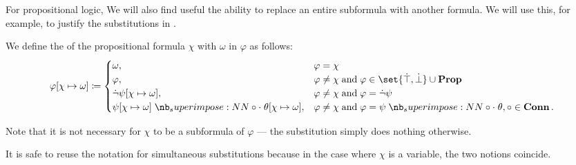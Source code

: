 For propositional logic, We will also find useful the ability to replace an entire subformula with another formula. We will use this, for example, to justify the substitutions in .

\begin{definition}\label{def:literal_propositional_substitution}
  We define the  of the propositional formula \( \chi \) with \( \omega \) in \( \varphi \) as follows:
  \begin{equation}\label{eq:def:propositional_substitution/single}
    \varphi[\chi \mapsto \omega] \coloneqq \begin{cases}
      \omega,                                                         &\varphi = \chi \\
      \varphi,                                                        &\varphi \neq \chi \T{and} \varphi \in \set{ \syntop, \synbot } \cup \op*{Prop} \\
      \synneg \psi[\chi \mapsto \omega],                              &\varphi \neq \chi \T{and} \varphi = \synneg \psi \\
      \psi[\chi \mapsto \omega] \syncirc \theta[\chi \mapsto \omega], &\varphi \neq \chi \T{and} \varphi = \psi \syncirc \theta, \circ \in \op*{Conn}.
    \end{cases}
  \end{equation}
\end{definition}
\begin{comments}
  \item Note that it is not necessary for \( \chi \) to be a subformula of \( \varphi \) --- the substitution simply does nothing otherwise.
  \item It is safe to reuse the notation for simultaneous substitutions because in the case where \( \chi \) is a variable, the two notions coincide.
\end{comments}

